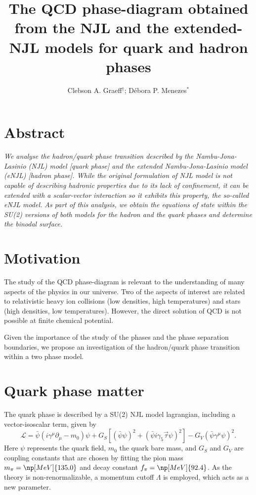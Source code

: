 \documentclass[plainsections,a0]{sciposterlocal}
\title{The QCD phase-diagram obtained from the NJL and the extended-NJL models for quark and hadron phases}
\author{Clebson A. Graeff$^\dagger$; Débora P. Menezes$^*$}
\institute{$^\dagger$~Universidade Tecnológica Federal do Paraná -- Pato Branco, PR - Brazil \\
$^*$~Universidade Federal de Santa Catarina -- Florian\'opolis, SC - Brazil \\
}
\begin{document}
\maketitle %

\begin{multicols}{2} %

\section*{Abstract}
{ \it
We analyse the hadron/quark phase transition described by the Nambu-Jona-Lasinio (NJL) model [quark phase] and the extended Nambu-Jona-Lasinio model (eNJL) [hadron phase]. While the original formulation of NJL model is not capable of describing hadronic properties due to its lack of confinement, it can be extended with a scalar-vector interaction so it exhibits this property, the so-called  eNJL model. As part of this analysis, we obtain the equations of state within the SU(2) versions of both models for the hadron and the quark phases and determine the binodal surface. 
}

\section*{Motivation}

The study of the QCD phase-diagram is relevant to the understanding of many aspects of the physics in our universe. Two of the aspects of interest are related to relativistic heavy ion collisions (low densities, high temperatures) and stars (high densities, low temperatures). However, the direct solution of QCD is not possible at finite chemical potential.

Given the importance of the study of the phases and the phase separation boundaries, we propose an investigation of the hadron/quark phase transition within a two phase model.

\section*{Quark phase matter}

The quark phase is described by a SU(2) NJL model lagrangian, including a vector-isoscalar term, given by \cite{Buballa2005}
\begin{equation}\label{Eq:LagNJL-SU2-Bub}
	\mathcal{L} =\bar{\psi}(i\gamma^\mu\partial_\mu - m_0)\psi + G_S[(\bar{\psi}\psi)^2 + (\bar{\psi}i\gamma_5\vec{\tau}\psi)^2] - G_V(\bar{\psi}\gamma^\mu \psi)^2.
\end{equation}
%
Here $\psi$ represents the quark field, $m_0$ the quark bare mass, and $G_S$ and $G_V$ are coupling constants that are chosen by fitting the pion mass $m_\pi = \np[MeV]{135.0}$ and decay constant $f_\pi = \np[MeV]{92.4}$. As the theory is non-renormalizable, a momentum cutoff $\Lambda$ is employed, which acts as a new parameter.


\end{multicols}
\end{document}

